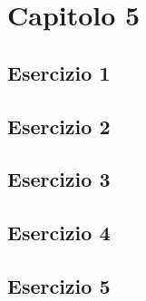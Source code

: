 \section{\textbf{Capitolo 5}}
\subsection{Esercizio 1}

\subsection{Esercizio 2}

\subsection{Esercizio 3}

\subsection{Esercizio 4}

\subsection{Esercizio 5}
